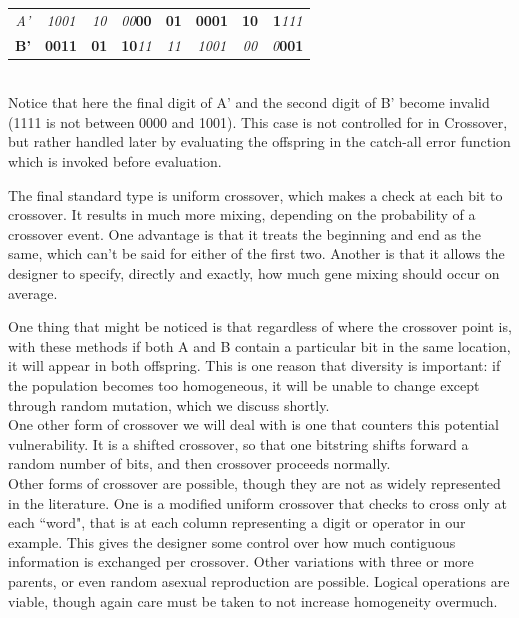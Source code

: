 \begin{tabular}{|c|c|c|c|c|c|c|c|}
	\hline
	\textit{A'} & \textit{1001} & \textit{10} & \textit{00}\textbf{00}  & \textbf{01} & \textbf{0001} & \textbf{10} & \textbf{1}\textit{111}\\ 
	\textbf{B'} & \textbf{0011} & \textbf{01} & \textbf{10}\textit{11} & \textit{11} & \textit{1001} & \textit{00} & \textit{0}\textbf{001}\\
	\hline
\end{tabular}\\

Notice that here the final digit of A' and the second digit of B' become invalid (1111 is not between 0000 and 1001). This case is not controlled for in Crossover, but rather handled later by evaluating the offspring in the catch-all error function which is invoked before evaluation.

The final standard type is uniform crossover, which makes a check at each bit to crossover.  It results in much more mixing, depending on the probability of a crossover event.  One advantage is that it treats the beginning and end as the same, which can't be said for either of the first two.  Another is that it allows the designer to specify, directly and exactly, how much gene mixing should occur on average.

One thing that might be noticed is that regardless of where the crossover point is, with these methods if both A and B contain a particular bit in the same location, it will appear in both offspring.  This is one reason that diversity is important:  if the population becomes too homogeneous, it will be unable to change except through random mutation, which we discuss shortly.\\
One other form of crossover we will deal with is one that counters this potential vulnerability.  It is a shifted crossover, so that one bitstring shifts forward a random number of bits, and then crossover proceeds normally.
\\
Other forms of crossover are possible, though they are not as widely represented in the literature.  One is a modified uniform crossover that checks to cross only  at each ``word", that is at each column representing a digit or operator in our example.  This gives the designer some control over how much contiguous information is exchanged per crossover.  Other variations with three or more parents, or even random asexual reproduction are possible.  Logical operations are viable, though again care must be taken to not increase homogeneity overmuch. \\

